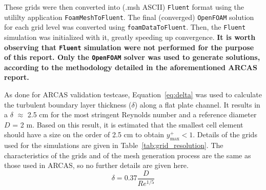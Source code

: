 \documentclass[12pt]{article}
\begin{document}
%
\noindent These grids were then converted into (.msh ASCII) \texttt{Fluent} format using the utililty application \texttt{FoamMeshToFluent}. The final (converged) \texttt{OpenFOAM} solution for each grid level was converted using \texttt{foamDataToFluent}. Then, the \texttt{Fluent} simulation was initialized with it, greatly speeding up convergence. \textbf{It is worth observing that \texttt{Fluent} simulation were not performed for the purpose of this report. Only the \texttt{OpenFOAM} solver was used to generate solutions, according to the methodology detailed in the aforementioned ARCAS report.} 

As done for ARCAS validation testcase, Equation~\ref{eq:delta} was used to calculate the turbulent boundary layer thickness ($\delta$) along a flat plate channel. It results in a $\delta$ $\approx$ 2.5 cm for the most stringent Reynolds number and a reference diameter $D$ = 2 m. Based on this result, it is estimated that the smallest cell element should have a size on the order of 2.5 cm to obtain $y^+_\text{max} < 1$. Details of the grids used for the simulations are given in Table~\ref{tab:grid_resolution}. The characteristics of the grids and of the mesh generation process are the same as those used in ARCAS, so no further details are given here.
%
\begin{equation}
    \delta = 0.37 \frac{D}{Re^{1/5}}\label{eq:delta}
\end{equation}
\end{document}
